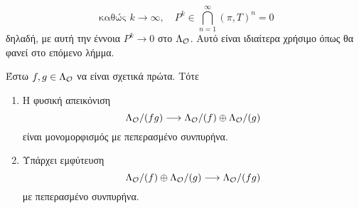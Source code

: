 $$ \text{ καθώς } k\longrightarrow \infty, \quad P^k \in \bigcap\limits_{n=1}^\infty (\pi,T)^n = 0$$ δηλαδή, με αυτή την έννοια $P^k \longrightarrow 0$ στο $\Lambda_\mathcal{O}$.
Αυτό είναι ιδιαίτερα χρήσιμο όπως θα φανεί στο επόμενο λήμμα.

\begin{lemma}\label{lemma4.11}
    Έστω $f,g \in \Lambda_\mathcal{O}$ να είναι σχετικά πρώτα. Τότε
    \begin{enumerate}
        \item Η φυσική απεικόνιση
        $$\Lambda_\mathcal{O}/(fg) \longrightarrow \Lambda_\mathcal{O}/(f) \oplus \Lambda_\mathcal{O} /(g)$$ είναι μονομορφισμός με πεπερασμένο συνπυρήνα.
        \item Υπάρχει εμφύτευση
        $$\Lambda_\mathcal{O}/(f) \oplus \Lambda_\mathcal{O}/(g) \longrightarrow \Lambda_\mathcal{O}/(fg)$$ με πεπερασμένο συνπυρήνα.
    \end{enumerate}
\end{lemma}

